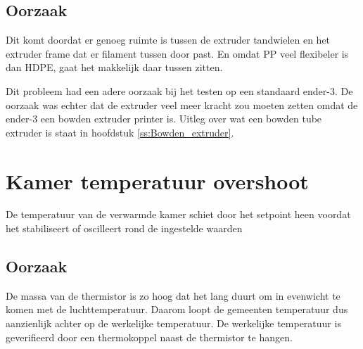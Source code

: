 \subsection{Oorzaak}

Dit komt doordat er genoeg ruimte is tussen de extruder tandwielen en het
extruder frame dat er filament tussen door past. En omdat PP veel flexibeler is
dan HDPE, gaat het makkelijk daar tussen zitten.

Dit probleem had een adere oorzaak bij het testen op een standaard ender-3. De
oorzaak was echter dat de extruder veel meer kracht zou moeten zetten omdat de
ender-3 een bowden extruder printer is. Uitleg over wat een bowden tube
extruder is staat in hoofdstuk \ref{ss:Bowden_extruder}.


\section{Kamer temperatuur overshoot}

De temperatuur van de verwarmde kamer schiet door het setpoint heen voordat het
stabiliseert of oscilleert rond de ingestelde waarden

\subsection{Oorzaak}

De massa van de thermistor is zo hoog dat het lang duurt om in evenwicht te
komen met de luchttemperatuur. Daarom loopt de gemeenten temperatuur dus
aanzienlijk achter op de werkelijke temperatuur. De werkelijke temperatuur is
geverifieerd door een thermokoppel naast de thermistor te hangen.